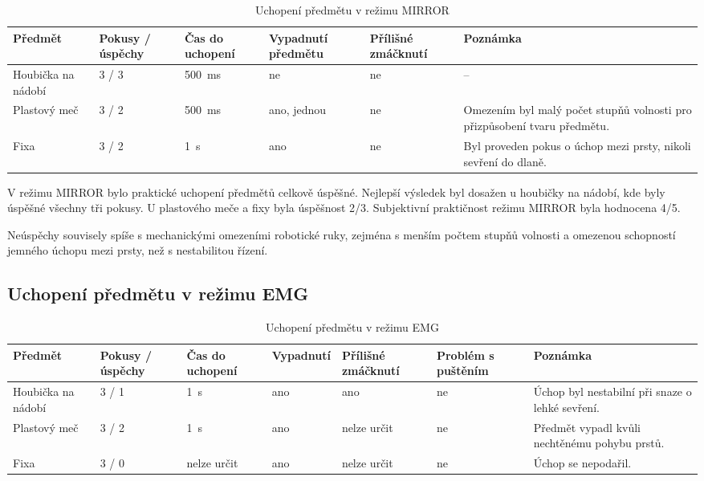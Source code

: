 \begin{table}[htbp]
\centering
\caption{Uchopení předmětu v režimu MIRROR}
\label{tab:mirror-uchopeni}
\setlength{\tabcolsep}{2pt}
\begin{tabular}{|p{}|p{}|p{}|p{}|p{}|p{}|}
\hline
\textbf{Předmět} & \textbf{Pokusy / úspěchy} & \textbf{Čas do uchopení} & \textbf{Vypadnutí předmětu} & \textbf{Přílišné zmáčknutí} & \textbf{Poznámka} \\
\hline
Houbička na nádobí & 3 / 3 & 500~ms & ne & ne & -- \\
\hline
Plastový meč & 3 / 2 & 500~ms & ano, jednou & ne & Omezením byl malý počet stupňů volnosti pro přizpůsobení tvaru předmětu. \\
\hline
Fixa & 3 / 2 & 1~s & ano & ne & Byl proveden pokus o úchop mezi prsty, nikoli sevření do dlaně. \\
\hline
\end{tabular}
\end{table}

V režimu MIRROR bylo praktické uchopení předmětů celkově úspěšné. Nejlepší výsledek byl dosažen u houbičky na nádobí, kde byly úspěšné všechny tři pokusy. U plastového meče a fixy byla úspěšnost 2/3. Subjektivní praktičnost režimu MIRROR byla hodnocena 4/5.

Neúspěchy souvisely spíše s mechanickými omezeními robotické ruky, zejména s menším počtem stupňů volnosti a omezenou schopností jemného úchopu mezi prsty, než s nestabilitou řízení.

\subsection{Uchopení předmětu v režimu EMG}
\label{subsec:uchopeni-emg}

\begin{table}[htbp]
\centering
\caption{Uchopení předmětu v režimu EMG}
\label{tab:emg-uchopeni}
\setlength{\tabcolsep}{2pt}
\begin{tabular}{|p{}|p{}|p{}|p{}|p{}|p{}|p{}|}
\hline
\textbf{Předmět} & \textbf{Pokusy / úspěchy} & \textbf{Čas do uchopení} & \textbf{Vypadnutí} & \textbf{Přílišné zmáčknutí} & \textbf{Problém s puštěním} & \textbf{Poznámka} \\
\hline
Houbička na nádobí & 3 / 1 & 1~s & ano & ano & ne & Úchop byl nestabilní při snaze o lehké sevření. \\
\hline
Plastový meč & 3 / 2 & 1~s & ano & nelze určit & ne & Předmět vypadl kvůli nechtěnému pohybu prstů. \\
\hline
Fixa & 3 / 0 & nelze určit & ano & nelze určit & ne & Úchop se nepodařil. \\
\hline
\end{tabular}
\end{table}

